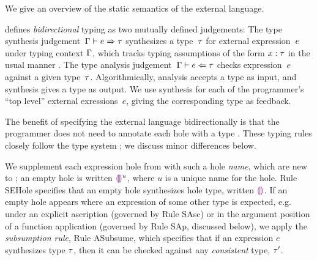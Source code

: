 

%
%
%

%




We give an overview of the static semantics of the \HazelnutLive
external language.

 defines \emph{bidirectional} typing
%
as two mutually defined judgements: The type synthesis
judgement~$\Gamma \vdash e \Rightarrow \tau$ synthesizes a type~$\tau$
for external expression~$e$ under typing context $\Gamma$, which tracks typing
assumptions of the form $x : \tau$ in the usual
manner \cite{pfpl,tapl}.
%
The type analysis judgement~$\Gamma \vdash e \Leftarrow \tau$ checks
expression~$e$ against a given type~$\tau$.
%
Algorithmically, analysis accepts a type as input, and synthesis gives
a type as output.
%
We use synthesis for each of the programmer's ``top level'' external
exressions~$e$, giving the corresponding type as feedback.


The benefit of specifying the \HazelnutLive external language
bidirectionally is that the programmer does not need to annotate each
hole with a type
%
\cite{Pierce:2000ve,bidi-tutorial,DBLP:conf/icfp/DunfieldK13,Chlipala:2005da}.
%
These typing rules closely follow the \Hazelnut type
system \cite{popl-paper}; we discuss minor differences below.

We supplement each expression hole from \Hazelnut with such a
hole \emph{name}, which are new to \HazelnutLive; an empty hole is
written $\textcolor{violet}{\llparenthesis}\textcolor{violet}{\rrparenthesis}^{u}$, where $u$ is a unique name for the hole.
%
Rule {SEHole} specifies that an empty hole synthesizes hole type, written $\textcolor{violet}{\llparenthesis}\textcolor{violet}{\rrparenthesis}$.
%
If an empty hole appears where an expression of some other type is
expected, e.g. under an explicit ascription (governed by Rule {SAsc})
or in the argument position of a function application (governed by
Rule {SAp}, discussed below), we apply the \emph{subsumption rule},
Rule {ASubsume}, which specifies that if an expression $e$ synthesizes
type $\tau$, then it can be checked against any \emph{consistent}
type, $\tau'$.

